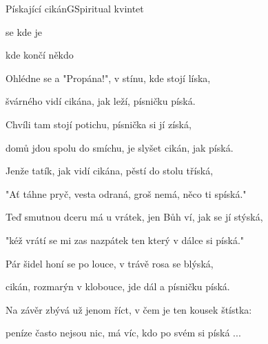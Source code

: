 \begin{song}{Pískající cikán}{G}{Spiritual kvintet}

\begin{SBVerse}

  se  kde  je 

 kde  končí   někdo 

\end{SBVerse}

\begin{SBVerse}

Ohlédne se a "Propána!", v stínu, kde stojí líska,

švárného vidí cikána, jak leží, písničku píská.

\end{SBVerse}

\begin{SBVerse}

Chvíli tam stojí potichu, písnička si jí získá,

domů jdou spolu do smíchu, je slyšet cikán, jak píská.

\end{SBVerse}

\begin{SBVerse}

Jenže tatík, jak vidí cikána, pěstí do stolu tříská,

"Ať táhne pryč, vesta odraná, groš nemá, něco ti spíská."

\end{SBVerse}

\begin{SBVerse}

Teď smutnou dceru má u vrátek, jen Bůh ví, jak se jí stýská,

"kéž vrátí se mi zas nazpátek ten který v dálce si píská."

\end{SBVerse}

\begin{SBVerse}

Pár šidel honí se po louce, v trávě rosa se blýská,

cikán, rozmarýn v klobouce, jde dál a písničku píská.

\end{SBVerse}

\begin{SBVerse}

Na závěr zbývá už jenom říct, v čem je ten kousek štístka:

peníze často nejsou nic, má víc, kdo po svém si píská ...

\end{SBVerse}

\end{song}

\pagebreak